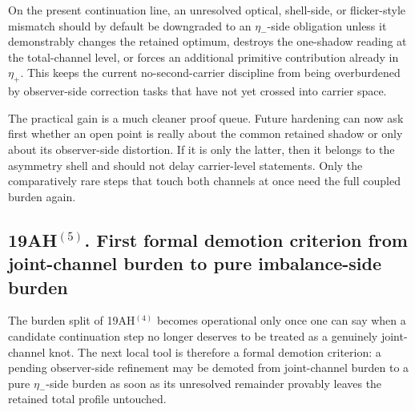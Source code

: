 \begin{corollary}
On the present continuation line, an unresolved optical, shell-side, or flicker-style mismatch should by default be downgraded to an \(\eta_-\)-side obligation unless it demonstrably changes the retained optimum, destroys the one-shadow reading at the total-channel level, or forces an additional primitive contribution already in \(\eta_+\). This keeps the current no-second-carrier discipline from being overburdened by observer-side correction tasks that have not yet crossed into carrier space.
\end{corollary}

\begin{remark}
The practical gain is a much cleaner proof queue. Future hardening can now ask first whether an open point is really about the common retained shadow or only about its observer-side distortion. If it is only the latter, then it belongs to the asymmetry shell and should not delay carrier-level statements. Only the comparatively rare steps that touch both channels at once need the full coupled burden again.
\end{remark}

\subsection*{19AH$^{(5)}$. First formal demotion criterion from joint-channel burden to pure imbalance-side burden}
The burden split of 19AH$^{(4)}$ becomes operational only once one can say when a candidate continuation step no longer deserves to be treated as a genuinely joint-channel knot. The next local tool is therefore a formal demotion criterion: a pending observer-side refinement may be demoted from joint-channel burden to a pure \(\eta_-\)-side burden as soon as its unresolved remainder provably leaves the retained total profile untouched.

